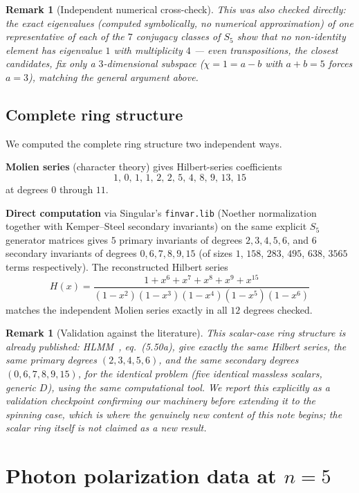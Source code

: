 \documentclass[reqno]{amsart}
\newtheorem{remark}[theorem]{Remark}
\begin{document}
\begin{remark}[Independent numerical cross-check]
This was also checked directly: the exact eigenvalues (computed symbolically, no numerical
approximation) of one representative of each of the $7$ conjugacy classes of $S_5$ show that no
non-identity element has eigenvalue $1$ with multiplicity $4$ --- even transpositions, the closest
candidates, fix only a $3$-dimensional subspace ($\chi=1=a-b$ with $a+b=5$ forces $a=3$), matching
the general argument above.
\end{remark}

\subsection{Complete ring structure}

We computed the complete ring structure two independent ways.

\textbf{Molien series} (character theory) gives Hilbert-series coefficients
\[
1,\,0,\,1,\,1,\,2,\,2,\,5,\,4,\,8,\,9,\,13,\,15
\]
at degrees $0$ through $11$.

\textbf{Direct computation} via Singular's \texttt{finvar.lib} (Noether normalization together
with Kemper--Steel secondary invariants) on the same explicit $S_5$ generator matrices gives $5$
primary invariants of degrees $2,3,4,5,6$, and $6$ secondary invariants of degrees $0,6,7,8,9,15$
(of sizes $1$, $158$, $283$, $495$, $638$, $3565$ terms respectively). The reconstructed Hilbert
series
\[
H(x)=\frac{1+x^6+x^7+x^8+x^9+x^{15}}{(1-x^2)(1-x^3)(1-x^4)(1-x^5)(1-x^6)}
\]
matches the independent Molien series exactly in all $12$ degrees checked.

\begin{remark}[Validation against the literature]
\label{rem:validation}
This scalar-case ring structure is \emph{already published}: HLMM~\cite{hlmm2017}, eq.~(5.50a),
give exactly the same Hilbert series, the same primary degrees $(2,3,4,5,6)$, and the same
secondary degrees $(0,6,7,8,9,15)$, for the identical problem (five identical massless scalars,
generic $D$), using the same computational tool. We report this explicitly as a validation
checkpoint confirming our machinery before extending it to the spinning case, which is where the
genuinely new content of this note begins; the scalar ring itself is \emph{not} claimed as a new
result.
\end{remark}

\section{Photon polarization data at \texorpdfstring{$n=5$}{n=5}}
\label{sec:polarization}
\end{document}
